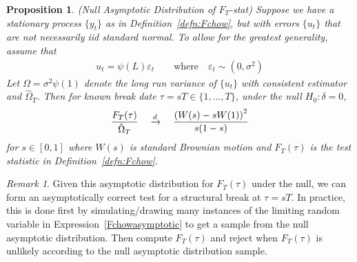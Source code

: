 \documentclass[12pt]{article}
\theoremstyle{plain}
\newtheorem{prop}[thm]{Proposition}
\theoremstyle{definition}
\theoremstyle{remark}
\newtheorem*{rmk}{Remark}
\newcommand{\dto}{\xrightarrow{d}}
\begin{document}
\begin{prop}\emph{(Null Asymptotic Distribution of $F_T$-stat)}
\label{prop:Fchow}
Suppose we have a stationary process $\{y_t\}$ as in
Definition~\ref{defn:Fchow}, but with errors $\{u_t\}$ that are not
necessarily iid standard normal.
To allow for the greatest generality, assume that
\begin{align*}
  u_t = \psi(L)\varepsilon_t
  \qquad\text{where}\quad
  \varepsilon_t \sim (0,\sigma^2)
\end{align*}
Let $\Omega=\sigma^2\psi(1)$ denote the long run variance of
$\{u_t\}$ with consistent estimator and $\hat{\Omega}_T$.
Then for known break date $\tau=sT\in\{1,\ldots,T\}$,
under the null $H_0:\delta=0$,
\begin{align}
  \frac{F_T(\tau)}{\hat{\Omega}_T}
  \quad\dto\quad
  \frac{%
    \left( W(s) - s W(1)\right)^2
  }{s(1-s)}
  \label{Fchowasymptotic}
\end{align}
for $s\in[0,1]$ where $W(s)$ is standard Brownian motion and $F_T(\tau)$
is the test statistic in Definition~\ref{defn:Fchow}.
\end{prop}
\begin{rmk}
Given this asymptotic distribution for $F_T(\tau)$ under the null, we can
form an asymptotically correct test for a structural break
at $\tau=sT$.
In practice, this is done first by simulating/drawing many instances of
the limiting random variable in Expression~\ref{Fchowasymptotic} to get
a sample from the null asymptotic distribution. Then compute $F_T(\tau)$
and reject when $F_T(\tau)$ is unlikely according to the null asymptotic
distribution sample.
\end{rmk}
\end{document}
